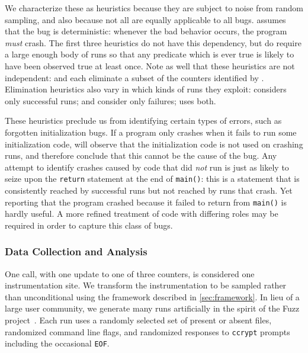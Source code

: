 We characterize these as heuristics because they are subject to noise
from random sampling, and also because not all are equally applicable
to all bugs.   assumes
that the bug is deterministic: whenever the bad behavior occurs, the
program \emph{must} crash.  The first three heuristics do not have
this dependency, but do require a large enough body of runs so that
any predicate which is ever true is likely to have been observed true
at least once.  Note as well that these heuristics are not
independent:  and  each eliminate a subset of the counters identified by
.  Elimination heuristics also vary in
which kinds of runs they exploit: 
considers only successful runs;  and
 consider only failures;
 uses both.

These heuristics preclude us from identifying certain types of errors,
such as forgotten initialization bugs.  If a program only crashes when
it fails to run some initialization code,  will observe that the initialization code is not used on
crashing runs, and therefore conclude that this cannot be the cause of
the bug.  Any attempt to identify crashes caused by code that did
\emph{not} run is just as likely to seize upon the \texttt{return}
statement at the end of \texttt{main()}: this is a statement that is
consistently reached by successful runs but not reached by runs that
crash.  Yet reporting that the program crashed because it failed to
return from \texttt{main()} is hardly useful.  A more refined
treatment of code with differing roles may be required in order to
capture this class of bugs.

\subsubsection{Data Collection and Analysis}

One call, with one update to one of three counters, is considered one
instrumentation site.  We transform the instrumentation to be sampled
rather than unconditional using the framework described in
\autoref{sec:framework}.  In lieu of a large user community, we
generate many runs artificially in the spirit of the Fuzz
project~\cite{MKLMMNS95}.  Each run uses a randomly selected set of
present or absent files, randomized command line flags, and randomized
responses to \texttt{ccrypt} prompts including the occasional
\texttt{EOF}.


